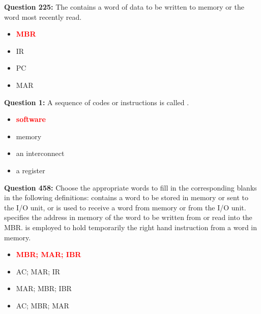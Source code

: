 \documentclass[12pt,a4paper]{article}
\begin{document}
\vspace{0.5cm}

\vspace{0.5cm}

\textbf{Question 225:} The \underline{\hspace{1.5cm}} contains a word of data to be written to memory or the word most recently read.

\begin{itemize}
    \item[\textbf{A.}] \textcolor{red}{\textbf{MBR}}
    \item[\textbf{B.}] IR
    \item[\textbf{C.}] PC
    \item[\textbf{D.}] MAR
\end{itemize}

\vspace{0.5cm}

\vspace{0.5cm}

\textbf{Question 1:} A sequence of codes or instructions is called \underline{\hspace{1.5cm}}.

\begin{itemize}
    \item[\textbf{A.}] \textcolor{red}{\textbf{software}}
    \item[\textbf{B.}] memory
    \item[\textbf{C.}] an interconnect
    \item[\textbf{D.}] a register
\end{itemize}

\vspace{0.5cm}

\vspace{0.5cm}

\textbf{Question 458:} Choose the appropriate words to fill in the corresponding blanks in the following definitions:
\underline{\hspace{1.5cm}} contains a word to be stored in memory or sent to the I/O unit, or is used to receive a word from memory or from the I/O unit. \underline{\hspace{1.5cm}} specifies the address in memory of the word to be written from or read into the MBR. \underline{\hspace{1.5cm}} is employed to hold temporarily the right hand instruction from a word in memory.

\begin{itemize}
    \item[\textbf{A.}] \textcolor{red}{\textbf{MBR; MAR; IBR}}
    \item[\textbf{B.}] AC; MAR; IR
    \item[\textbf{C.}] MAR; MBR; IBR
    \item[\textbf{D.}] AC; MBR; MAR
\end{itemize}
\end{document}
